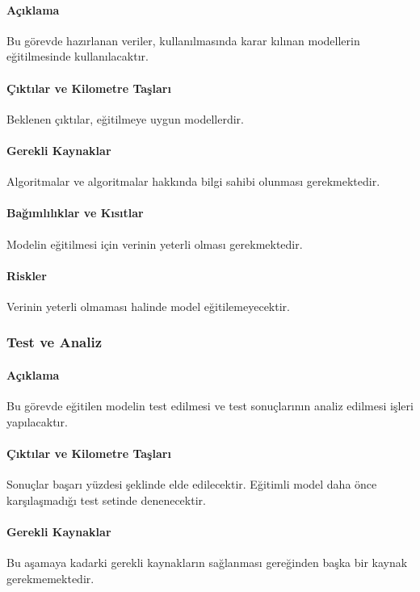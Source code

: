 \documentclass[12pt,a4paper]{article}
\begin{document}
   \paragraph{Açıklama}
   Bu görevde hazırlanan veriler, kullanılmasında karar kılınan modellerin eğitilmesinde kullanılacaktır.

   \paragraph{Çıktılar ve Kilometre Taşları}
   Beklenen çıktılar, eğitilmeye uygun modellerdir.
   
   \paragraph{Gerekli Kaynaklar}
   Algoritmalar ve algoritmalar hakkında bilgi sahibi olunması gerekmektedir.

   \paragraph{Bağımlılıklar ve Kısıtlar}
   Modelin eğitilmesi için verinin yeterli olması gerekmektedir. 

   \paragraph{Riskler}
   Verinin yeterli olmaması halinde model eğitilemeyecektir.


   \subsubsection{Test ve Analiz}
   \paragraph{Açıklama}
   Bu görevde eğitilen modelin test edilmesi ve test sonuçlarının analiz edilmesi işleri yapılacaktır.

   \paragraph{Çıktılar ve Kilometre Taşları}
   Sonuçlar başarı yüzdesi şeklinde elde edilecektir. Eğitimli model daha önce karşılaşmadığı test setinde denenecektir.

   \paragraph{Gerekli Kaynaklar}
   Bu aşamaya kadarki gerekli kaynakların sağlanması gereğinden başka bir kaynak gerekmemektedir.
\end{document}
